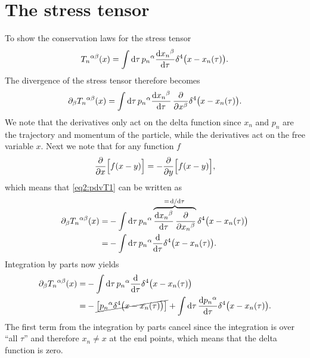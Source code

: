 \documentclass[11pt,a4paper, 
swedish, english %
]{article}
\begin{document}
\section{The stress tensor}
To show the conservation laws for the stress tensor\footnotemark{}
\begin{equation}
{T_n}^{\alpha\beta}(x)=\int\rd\tau\,{p_n}^\alpha
\dv{{x_n}^\beta}{\tau}\delta^4\big(x-x_n(\tau)\big).
\end{equation}
The divergence of the stress tensor therefore becomes
\begin{equation}\label{eq2:pdvT1}
\pd_\beta{T_n}^{\alpha\beta}(x)=\int\rd\tau\,{p_n}^\alpha
\dv{{x_n}^\beta}{\tau}\,\pdv{x^\beta}\delta^4\big(x-x_n(\tau)\big).
\end{equation}
We note that the derivatives only act on the delta function since
$x_n$ and $p_n$ are the trajectory and momentum of the particle, while
the derivatives act on the free variable $x$. Next we note that for
any function $f$ 
\begin{equation}
\pdv{x}\Big[f(x-y)\Big]=-\pdv{y}\Big[f(x-y)\Big],
\end{equation}
which means that \eqref{eq2:pdvT1} can be written as
\vspace{-1em}
\begin{equation}
\begin{aligned}
\pd_\beta{T_n}^{\alpha\beta}(x)=&-\int\rd\tau\,{p_n}^\alpha
\overbrace{\dv{{x_n}^\beta}{\tau}\,\pdv{{x_n}^\beta}}^{=\dv*\tau}
\delta^4\big(x-x_n(\tau)\big)\\
=&-\int\rd\tau\,{p_n}^\alpha\dv{\tau}\delta^4\big(x-x_n(\tau)\big).
\end{aligned}
\end{equation}
Integration by parts now yields
\begin{equation}
\begin{aligned}
\pd_\beta{T_n}^{\alpha\beta}(x)=&
-\int\rd\tau\,{p_n}^\alpha\dv{\tau}\delta^4\big(x-x_n(\tau)\big)\\
=&-\cancel{\qty[{p_n}^\alpha\delta^4\big(x-x_n(\tau)\big)]}
+\int\rd\tau\,\dv{{p_n}^\alpha}{\tau}\delta^4\big(x-x_n(\tau)\big).
\end{aligned}
\end{equation}
The first term from the integration by parts cancel since the
integration is over ``all $\tau$'' and therefore $x_n\neq x$ at the
end points, which means that the delta function is zero.
\end{document}
